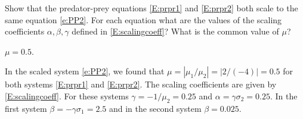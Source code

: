 \documentclass{ximera}
\begin{document}
\begin{exercise} \label{c9.1.6}
Show that the predator-prey equations \eqref{E:prpr1} and \eqref{E:prpr2} both 
scale to the same equation \eqref{e:PP2}.  For each equation what are the 
values of the scaling coefficients $\alpha,\beta,\gamma$ defined in 
\eqref{E:scalingcoeff}?  What is the common value of $\mu$?

\begin{solution}
\ans  $\mu = 0.5$.

\soln  In the scaled system \eqref{e:PP2}, we found that
$\mu=|\mu_1/\mu_2|= |2/(-4)|=0.5$ for both systems \eqref{E:prpr1} and 
\eqref{E:prpr2}.  The scaling coefficients are given by \eqref{E:scalingcoeff}. 
For these systems $\gamma=-1/\mu_2=0.25$ and
$\alpha=\gamma\sigma_2=0.25$.  In the first system
$\beta=-\gamma\sigma_1= 2.5$ and in the second system $\beta=0.025$.

\end{solution}
\end{exercise}
\end{document}
